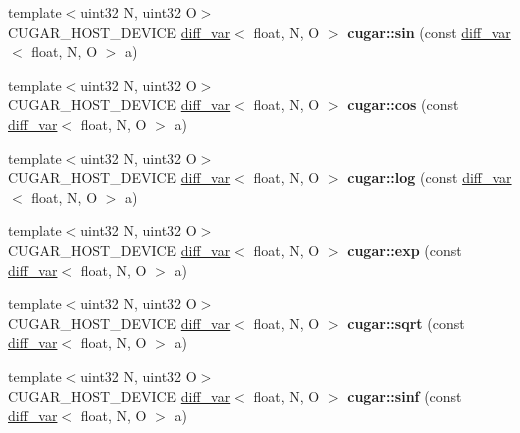 \begin{DoxyCompactItemize}
{\footnotesize template$<$uint32 N, uint32 O$>$ }\\C\+U\+G\+A\+R\+\_\+\+H\+O\+S\+T\+\_\+\+D\+E\+V\+I\+CE \hyperlink{structcugar_1_1diff__var}{diff\+\_\+var}$<$ float, N, O $>$ {\bfseries cugar\+::sin} (const \hyperlink{structcugar_1_1diff__var}{diff\+\_\+var}$<$ float, N, O $>$ a)
\item 
\mbox{\label{group___auto_diff_module_ga95af37852ec2055252cefd175306a46b}} 
{\footnotesize template$<$uint32 N, uint32 O$>$ }\\C\+U\+G\+A\+R\+\_\+\+H\+O\+S\+T\+\_\+\+D\+E\+V\+I\+CE \hyperlink{structcugar_1_1diff__var}{diff\+\_\+var}$<$ float, N, O $>$ {\bfseries cugar\+::cos} (const \hyperlink{structcugar_1_1diff__var}{diff\+\_\+var}$<$ float, N, O $>$ a)
\item 
\mbox{\label{group___auto_diff_module_gaf8c97afd5a2327f6717dcc0ac2b466cf}} 
{\footnotesize template$<$uint32 N, uint32 O$>$ }\\C\+U\+G\+A\+R\+\_\+\+H\+O\+S\+T\+\_\+\+D\+E\+V\+I\+CE \hyperlink{structcugar_1_1diff__var}{diff\+\_\+var}$<$ float, N, O $>$ {\bfseries cugar\+::log} (const \hyperlink{structcugar_1_1diff__var}{diff\+\_\+var}$<$ float, N, O $>$ a)
\item 
\mbox{\label{group___auto_diff_module_ga5ec0265d8a9d69f4c2d9e44ffc90f000}} 
{\footnotesize template$<$uint32 N, uint32 O$>$ }\\C\+U\+G\+A\+R\+\_\+\+H\+O\+S\+T\+\_\+\+D\+E\+V\+I\+CE \hyperlink{structcugar_1_1diff__var}{diff\+\_\+var}$<$ float, N, O $>$ {\bfseries cugar\+::exp} (const \hyperlink{structcugar_1_1diff__var}{diff\+\_\+var}$<$ float, N, O $>$ a)
\item 
\mbox{\label{group___auto_diff_module_gae2631f8408dfed8d450f1fa14ed06f08}} 
{\footnotesize template$<$uint32 N, uint32 O$>$ }\\C\+U\+G\+A\+R\+\_\+\+H\+O\+S\+T\+\_\+\+D\+E\+V\+I\+CE \hyperlink{structcugar_1_1diff__var}{diff\+\_\+var}$<$ float, N, O $>$ {\bfseries cugar\+::sqrt} (const \hyperlink{structcugar_1_1diff__var}{diff\+\_\+var}$<$ float, N, O $>$ a)
\item 
\mbox{\label{group___auto_diff_module_ga2c901b6d1584e5beadc4b68a55cca0b0}} 
{\footnotesize template$<$uint32 N, uint32 O$>$ }\\C\+U\+G\+A\+R\+\_\+\+H\+O\+S\+T\+\_\+\+D\+E\+V\+I\+CE \hyperlink{structcugar_1_1diff__var}{diff\+\_\+var}$<$ float, N, O $>$ {\bfseries cugar\+::sinf} (const \hyperlink{structcugar_1_1diff__var}{diff\+\_\+var}$<$ float, N, O $>$ a)

\end{DoxyCompactItemize}
